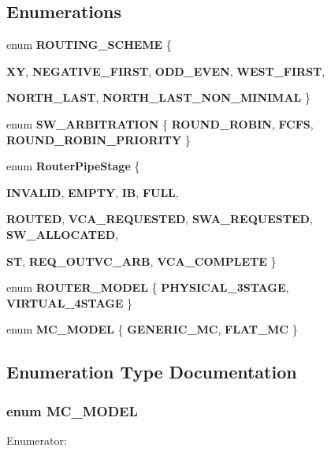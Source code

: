 \subsection*{Enumerations}
\begin{CompactItemize}
\item 
enum {\bf ROUTING\_\-SCHEME} \{ \par
{\bf XY}, 
{\bf NEGATIVE\_\-FIRST}, 
{\bf ODD\_\-EVEN}, 
{\bf WEST\_\-FIRST}, 
\par
{\bf NORTH\_\-LAST}, 
{\bf NORTH\_\-LAST\_\-NON\_\-MINIMAL}
 \}
\item 
enum {\bf SW\_\-ARBITRATION} \{ {\bf ROUND\_\-ROBIN}, 
{\bf FCFS}, 
{\bf ROUND\_\-ROBIN\_\-PRIORITY}
 \}
\item 
enum {\bf RouterPipeStage} \{ \par
{\bf INVALID}, 
{\bf EMPTY}, 
{\bf IB}, 
{\bf FULL}, 
\par
{\bf ROUTED}, 
{\bf VCA\_\-REQUESTED}, 
{\bf SWA\_\-REQUESTED}, 
{\bf SW\_\-ALLOCATED}, 
\par
{\bf ST}, 
{\bf REQ\_\-OUTVC\_\-ARB}, 
{\bf VCA\_\-COMPLETE}
 \}
\item 
enum {\bf ROUTER\_\-MODEL} \{ {\bf PHYSICAL\_\-3STAGE}, 
{\bf VIRTUAL\_\-4STAGE}
 \}
\item 
enum {\bf MC\_\-MODEL} \{ {\bf GENERIC\_\-MC}, 
{\bf FLAT\_\-MC}
 \}
\end{CompactItemize}


\subsection{Enumeration Type Documentation}
\subsubsection[{MC\_\-MODEL}]{\setlength{\rightskip}{0pt plus 5cm}enum {\bf MC\_\-MODEL}}\label{genericData_8h_8e2fd46fcbafd222a638be10eafa4e6c}


\begin{Desc}
\item[Enumerator: ]\par
\begin{description}
\item[{\em 
GENERIC\_\-MC\label{genericData_8h_8e2fd46fcbafd222a638be10eafa4e6c5e1ae027cf01a625a2ad1a1b83a5f556}
}]\item[{\em 
FLAT\_\-MC\label{genericData_8h_8e2fd46fcbafd222a638be10eafa4e6c18767e421b8140f43e7fc05923a5d2e3}
}]\end{description}
\end{Desc}



